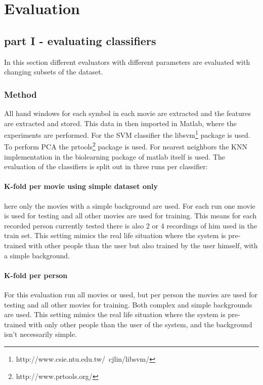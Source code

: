 \section{Evaluation}

\subsection{part I - evaluating classifiers}
In this section different evaluators with different parameters are evaluated with changing subsets of the dataset.

\subsubsection{Method}
All hand windows for each symbol in each movie are extracted and the features are extracted and stored. This data in then imported in Matlab, where the experiments are performed. For the SVM classifier the libsvm\footnote{http://www.csie.ntu.edu.tw/~cjlin/libsvm/} package is used. To perform PCA the prtools\footnote{http://www.prtools.org/} package is used. For nearest neighbors the KNN implementation in the biolearning package of matlab itself is used. The evaluation of the classifiers is split out in three runs per classifier:

\paragraph{K-fold per movie using simple dataset only}
here only the movies with a simple background are used. For each run one movie is used for testing and all other movies are used for training. This means for each recorded person currently tested there is also 2 or 4 recordings of him used in the train set. This setting mimics the real life situation where the system is pre-trained with other people than the user but also trained by the user himself, with a simple background.

\paragraph{K-fold per person}
For this evaluation run all movies or used, but per person the movies are used for testing and all other movies for training. Both complex and simple backgrounds are used. This setting mimics the real life situation where the system is pre-trained with only other people than the user of the system, and the background isn't necessarily simple. 

